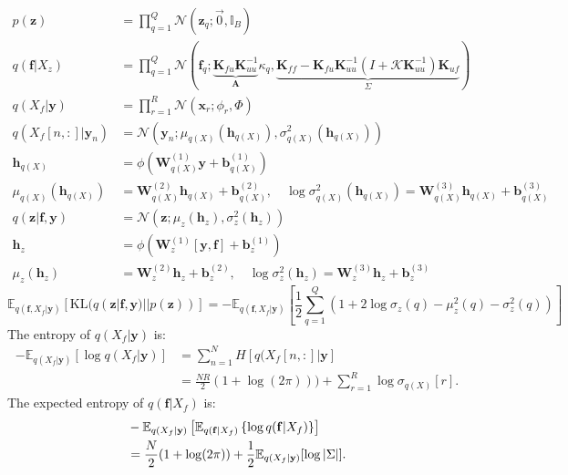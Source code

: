 \documentclass[12pt]{article}
\newcommand{\Kappa}{\mathcal{K}}
\newcommand{\xb}{\mathbf{x}}
\newcommand{\zb}{\mathbf{z}}
\newcommand{\fb}{\mathbf{f}}
\newcommand{\Ab}{\mathbf{A}}
\newcommand{\yb}{\mathbf{y}}
\newcommand{\Kff}{\mathbf{K}_{ff}}
\newcommand{\Kuu}{\mathbf{K}_{uu}}
\newcommand{\Kuf}{\mathbf{K}_{uf}}
\newcommand{\Kfu}{\mathbf{K}_{fu}}
\newcommand{\Ex}{\mathbb{E}}
\newcommand{\KL}{\mathrm{KL}}
\newcommand{\No}{\mathcal{N}}
\newcommand{\Wb}{\mathbf{W}}
\newcommand{\hb}{\mathbf{h}}
\newcommand{\bb}{\mathbf{b}}
\begin{document}
\begin{align}
p(\zb) &= \prod_{q=1}^Q \mathcal{N}(\zb_q; \vec{0}, \mathbb{I}_B) \\
q(\fb|X_z) &= \prod_{q=1}^Q \mathcal{N}(\fb_q; \underbrace{\Kfu\Kuu^{-1}}_{\Ab}\kappa_q, \underbrace{\Kff-\Kfu\Kuu^{-1}(I + \Kappa\Kuu^{-1})\Kuf}_{\Sigma}) \\
q(X_f|\yb) &= \prod_{r=1}^R \mathcal{N}(\xb_r; \phi_r, \Phi) \\
q(X_f[n,:]|\yb_n) &= \No(\yb_n; \mu_{q(X)}(\hb_{q(X)}), \sigma^2_{q(X)}(\hb_{q(X)})) \\
\hb_{q(X)} &= \phi(\Wb^{(1)}_{q(X)}\yb + \bb^{(1)}_{q(X)}) \\
\mu_{q(X)}(\hb_{q(X)}) &= \Wb^{(2)}_{q(X)}\hb_{q(X)} + \bb^{(2)}_{q(X)},\quad \log\sigma^2_{q(X)}(\hb_{q(X)}) = \Wb^{(3)}_{q(X)}\hb_{q(X)} + \bb^{(3)}_{q(X)} \\
q(\zb|\fb,\yb) &= \No(\zb; \mu_z(\hb_z), \sigma^2_z(\hb_z)) \\
\hb_z &= \phi(\Wb^{(1)}_z[\yb,\fb] + \bb^{(1)}_z) \\
\mu_z(\hb_z) &= \Wb^{(2)}_z\hb_z + \bb^{(2)}_z,\quad \log\sigma^2_z(\hb_z) = \Wb^{(3)}_z\hb_z + \bb^{(3)}_z
\end{align}
%
\begin{equation}
\Ex_{q(\fb,X_f|\yb)}\left[\KL(q(\zb|\fb,\yb)||p(\zb))\right] = -\Ex_{q(\fb,X_f|\yb)}\left[ \frac{1}{2}\sum_{q=1}^Q\left( 1 + 2\log\sigma_z(q) - \mu^2_z(q) - \sigma^2_z(q) \right) \right]
\end{equation}
%
The entropy of $q(X_f|\yb)$ is:
%
\begin{align}
-\Ex_{q(X_f|\yb)}\left[\log q(X_f|\yb)\right] &= \sum_{n=1}^N H[q(X_f[n,:]|\yb] \\
&= \frac{NR}{2}(1+\log(2\pi))) + \sum_{r=1}^R\log\sigma_{q(X)}[r].
\end{align}
%
The expected entropy of $q(\fb|X_f)$ is:
%
\begin{align}
    &- \Ex_{q(X_f|\yb)}\left[ \Ex_{q(\fb|X_f)}\left\{\log q(\fb|X_f) \right\} \right] \notag \\
    &= \frac{N}{2}(1 + \log (2\pi)) + \frac{1}{2} \Ex_{q(X_f|\yb)}[\log|\Sigma|].
\end{align}
%
\end{document}
